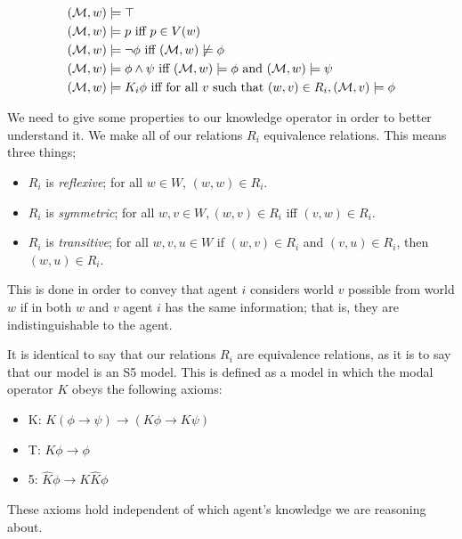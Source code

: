 \documentclass[12pt, a4paper]{article}
\begin{document}
\begin{align*}
  (\mathcal{M}, w) & \models \top \\
  (\mathcal{M}, w) & \models p \text{ iff } p \in V(w) \\
  (\mathcal{M}, w) & \models \neg \phi \text{ iff } (\mathcal{M}, w) \not \models \phi \\
  (\mathcal{M}, w) & \models \phi \land \psi \text{ iff } (\mathcal{M}, w) \models \phi \text{ and } (\mathcal{M}, w) \models \psi \\
  (\mathcal{M}, w) & \models K_i \phi \text{ iff for all $v$ such that } (w, v) \in R_i, (\mathcal{M}, v) \models \phi 
\end{align*}

\bigskip 

We need to give some properties to our knowledge operator in order to better
understand it. We make all of our relations $R_i$ equivalence relations. This
means three things;

\begin{itemize}
\item $R_i$ is \textit{reflexive}; for all $w \in W$, $(w, w) \in R_i$.
\item $R_i$ is \textit{symmetric}; for all $w, v \in W, (w, v) \in R_i$ iff $(v,
  w) \in R_i$.
\item $R_i$ is \textit{transitive}; for all $w, v, u \in W$ if $(w, v) \in R_i$
  and $(v, u) \in R_i$, then $(w, u) \in R_i$.
\end{itemize}

This is done in order to convey that agent $i$ considers world $v$ possible from
world $w$ if in both $w$ and $v$ agent $i$ has the same information; that is,
they are indistinguishable to the agent.

It is identical to say that our relations $R_i$ are equivalence relations, as it
is to say that our model is an \textsf{S5} model. This is defined as a model in
which the modal operator $K$ obeys the following axioms:

\begin{itemize}
\item \textsf{K}: $K (\phi \rightarrow \psi) \rightarrow (K \phi \rightarrow K
  \psi)$
\item \textsf{T}: $K \phi \rightarrow \phi$
\item \textsf{5}: $\widehat K \phi \rightarrow K \widehat K \phi$
\end{itemize}

These axioms hold independent of which agent's knowledge we are reasoning about. 
\end{document}

